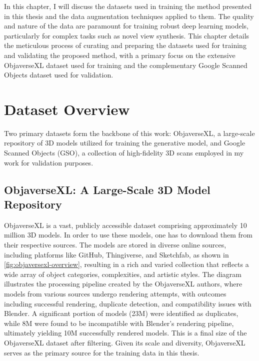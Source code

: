 \label{chapter:data-preparation}

In this chapter, I will discuss the datasets used in training the method presented in this thesis and the data augmentation techniques applied to them.
The quality and nature of the data are paramount for training robust deep learning models, particularly for complex tasks such as novel view synthesis. This chapter details the meticulous process of curating and preparing the datasets used for training and validating the proposed method, with a primary focus on the extensive ObjaverseXL dataset used for training and the complementary Google Scanned Objects dataset used for validation.

\section{Dataset Overview}\label{sec:dataset-overview}

Two primary datasets form the backbone of this work: ObjaverseXL, a large-scale repository of 3D models utilized for training the generative model, and Google Scanned Objects (GSO), a collection of high-fidelity 3D scans employed in my work for validation purposes.

\subsection{ObjaverseXL: A Large-Scale 3D Model Repository}\label{ssec:objaversexl-overview}
ObjaverseXL \cite{objaversexl} is a vast, publicly accessible dataset comprising approximately 10 million 3D models. In order to use these models, one has to download them from their respective sources. The models are stored in diverse online sources, including platforms like GitHub, Thingiverse, and Sketchfab, as shown in \ref{fig:objaversexl-overview}, resulting in a rich and varied collection that reflects a wide array of object categories, complexities, and artistic styles. The diagram illustrates the processing pipeline created by the ObjaverseXL authors, where models from various sources undergo rendering attempts, with outcomes including successful rendering, duplicate detection, and compatibility issues with Blender. A significant portion of models (23M) were identified as duplicates, while 8M were found to be incompatible with Blender's rendering pipeline, ultimately yielding 10M successfully rendered models. This is a final size of the ObjaverseXL dataset after filtering. Given its scale and diversity, ObjaverseXL serves as the primary source for the training data in this thesis.

